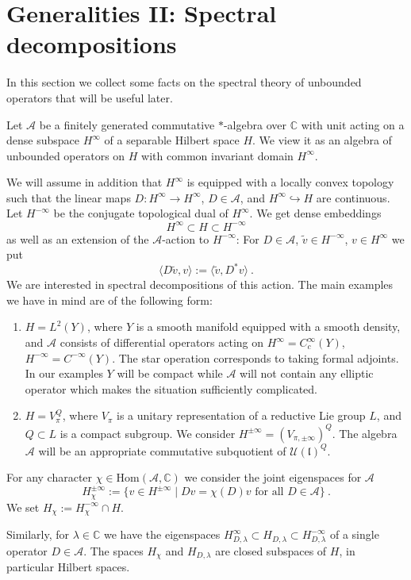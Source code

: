 \documentclass[10]{amsart}
\theoremstyle{remark}
\theoremstyle{definition}
\numberwithin{equation}{section}
\newcommand{\C}{\mathbb{C}}           %
\newcommand{\Hom}{\mathrm{Hom}}
\newcommand{\fl}{{\mathfrak l}}
\newcommand{\Cal}{\mathcal}
\newcommand{\defn}{{:=}}
\begin{document}
{\section{Generalities II: Spectral decompositions}\label{G2}

In this section we collect some facts on the spectral theory of unbounded operators that will be useful later.

Let $\Cal A$ be a finitely generated commutative $*$-algebra over $\C$ with unit acting on a dense subspace  $H^\infty$ of a separable Hilbert space $H$. We view it as an algebra
of unbounded operators on $H$ with common invariant domain $H^\infty$.

We will assume in addition that $H^\infty$ is equipped with a locally convex topology such that the linear maps $D: H^\infty \rightarrow H^\infty$, $D\in\Cal A$, and
$H^\infty\hookrightarrow H$ are continuous. Let $H^{-\infty}$ be the conjugate topological dual of $H^\infty$. We get dense embeddings
$$ H^\infty\subset H \subset H^{-\infty}$$
as well as an extension of the $\Cal A$-action to $H^{-\infty}$: For $D\in\Cal A$, $\tilde v\in H^{-\infty}$, $v\in H^\infty$ we put
$$\langle D\tilde v, v\rangle\defn \langle \tilde v, D^* v\rangle\ .$$
We are interested in spectral decompositions of this action. The main examples we have in mind are of the following form:
\begin{enumerate}
\item $H=L^2(Y)$, where $Y$ is a smooth manifold equipped with a smooth density, and $\Cal A$ consists of differential operators acting on
$H^\infty=C^\infty_c(Y)$, $H^{-\infty}=C^{-\infty}(Y)$. The star operation corresponds to taking formal adjoints. In our examples $Y$ will be compact while
$\Cal A$ will not contain any elliptic operator which makes the situation sufficiently complicated.
\item $H=V_\pi^Q$, where $V_\pi$ is a unitary representation of a reductive Lie group $L$, and $Q\subset L$ is a compact subgroup. We consider 
$H^{\pm\infty}=( V_{\pi,\pm\infty})^Q$. The algebra $\Cal A$ will be an appropriate commutative subquotient of ${\Cal U}(\fl)^Q$.
\end{enumerate}

For any character $\chi\in\Hom(\Cal A, \C)$ we consider the joint eigenspaces for $\Cal A$ 
$$ H_\chi^{\pm\infty}\defn\{v\in H^{\pm\infty}\mid Dv=\chi(D)v\mbox{ for all }D\in\Cal A\}\ .$$
We set $H_\chi\defn H_\chi^{-\infty}\cap H$.

Similarly, for $\lambda\in \C$ we have the eigenspaces $H_{D,\lambda}^\infty\subset H_{D,\lambda}\subset H_{D,\lambda}^{-\infty}$ of a single operator $D\in\Cal A$.
The spaces $H_\chi$ and $H_{D,\lambda}$ are closed subspaces of $H$, in particular Hilbert spaces.

}
\end{document}
